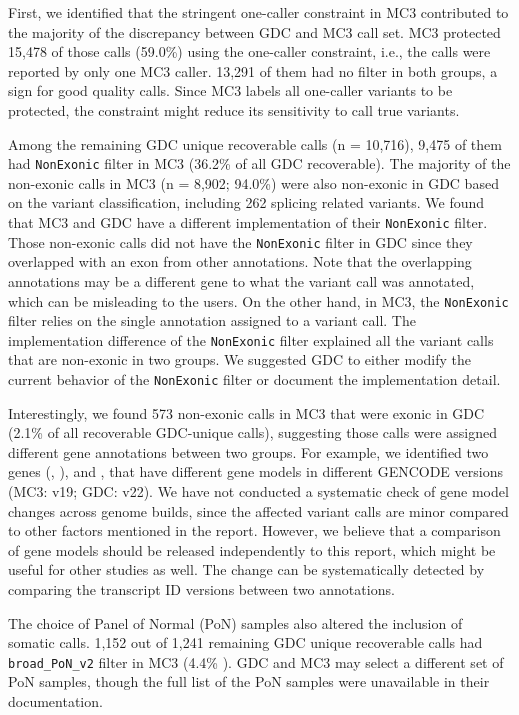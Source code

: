 First, we identified that the stringent one-caller constraint in MC3 contributed to the majority of the discrepancy between GDC and MC3 call set. MC3 protected 15,478 of those calls (59.0\%) using the one-caller constraint, i.e., the calls were reported by only one MC3 caller. 13,291 of them had no filter in both groups, a sign for good quality calls. Since MC3 labels all one-caller variants to be protected, the constraint might reduce its sensitivity to call true variants.

Among the remaining GDC unique recoverable calls (n = 10,716), 9,475 of them had \texttt{NonExonic} filter in MC3 (36.2\% of all GDC recoverable). The majority of the non-exonic calls in MC3 (n = 8,902; 94.0\%) were also non-exonic in GDC based on the variant classification, including 262 splicing related variants. We found that MC3 and GDC have a different implementation of their \texttt{NonExonic} filter. Those non-exonic calls did not have the \texttt{NonExonic} filter in GDC since they overlapped with an exon from other annotations. Note that the overlapping annotations may be a different gene to what the variant call was annotated, which can be misleading to the users. On the other hand, in MC3, the \texttt{NonExonic} filter relies on the single annotation assigned to a variant call. The implementation difference of the \texttt{NonExonic} filter explained all the variant calls that are non-exonic in two groups. We suggested GDC to either modify the current behavior of the \texttt{NonExonic} filter or document the implementation detail.

Interestingly, we found 573 non-exonic calls in MC3 that were exonic in GDC (2.1\% of all recoverable GDC-unique calls), suggesting those calls were assigned different gene annotations between two groups. For example, we identified two genes (, ),  and , that have different gene models in different GENCODE versions (MC3: v19; GDC: v22). We have not conducted a systematic check of gene model changes across genome builds, since the affected variant calls are minor compared to other factors mentioned in the report. However, we believe that a comparison of gene models should be released independently to this report, which might be useful for other studies as well. The change can be systematically detected by comparing the transcript ID versions between two annotations.

The choice of Panel of Normal (PoN) samples also altered the inclusion of somatic calls. 1,152 out of 1,241 remaining GDC unique recoverable calls had \texttt{broad\_PoN\_v2} filter in MC3 (4.4\% ). GDC and MC3 may select a different set of PoN samples, though the full list of the PoN samples were unavailable in their documentation.


